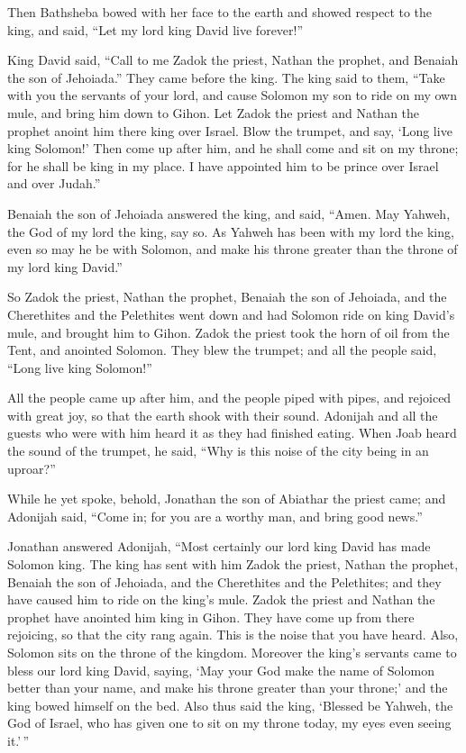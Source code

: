  Then Bathsheba bowed with her face to the earth and showed
respect to the king, and said, ``Let my lord king David live forever!''

 King David said, ``Call to me Zadok the priest, Nathan the
prophet, and Benaiah the son of Jehoiada.'' They came before the king.
 The king said to them, ``Take with you the servants of
your lord, and cause Solomon my son to ride on my own mule, and bring
him down to Gihon.  Let Zadok the priest and Nathan the
prophet anoint him there king over Israel. Blow the trumpet, and say,
`Long live king Solomon!'  Then come up after him, and he
shall come and sit on my throne; for he shall be king in my place. I
have appointed him to be prince over Israel and over Judah.''

 Benaiah the son of Jehoiada answered the king, and said,
``Amen. May Yahweh, the God of my lord the king, say so. 
As Yahweh has been with my lord the king, even so may he be with
Solomon, and make his throne greater than the throne of my lord king
David.''

 So Zadok the priest, Nathan the prophet, Benaiah the son
of Jehoiada, and the Cherethites and the Pelethites went down and had
Solomon ride on king David's mule, and brought him to Gihon.
 Zadok the priest took the horn of oil from the Tent, and
anointed Solomon. They blew the trumpet; and all the people said, ``Long
live king Solomon!''

 All the people came up after him, and the people piped
with pipes, and rejoiced with great joy, so that the earth shook with
their sound.  Adonijah and all the guests who were with him
heard it as they had finished eating. When Joab heard the sound of the
trumpet, he said, ``Why is this noise of the city being in an uproar?''

 While he yet spoke, behold, Jonathan the son of Abiathar
the priest came; and Adonijah said, ``Come in; for you are a worthy man,
and bring good news.''

 Jonathan answered Adonijah, ``Most certainly our lord king
David has made Solomon king.  The king has sent with him
Zadok the priest, Nathan the prophet, Benaiah the son of Jehoiada, and
the Cherethites and the Pelethites; and they have caused him to ride on
the king's mule.  Zadok the priest and Nathan the prophet
have anointed him king in Gihon. They have come up from there rejoicing,
so that the city rang again. This is the noise that you have heard.
 Also, Solomon sits on the throne of the kingdom.
 Moreover the king's servants came to bless our lord king
David, saying, `May your God make the name of Solomon better than your
name, and make his throne greater than your throne;' and the king bowed
himself on the bed.  Also thus said the king, `Blessed be
Yahweh, the God of Israel, who has given one to sit on my throne today,
my eyes even seeing it.'\,''

